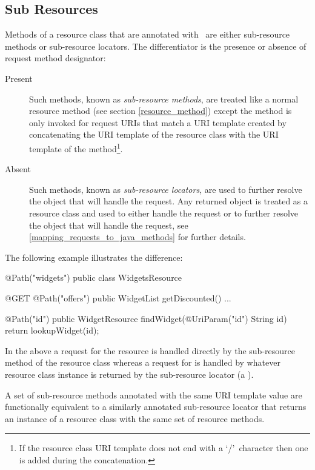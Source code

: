 \subsection{Sub Resources}
\label{sub_resources}

Methods of a resource class that are annotated with \Path\ are either sub-resource methods or sub-resource locators. The differentiator is the presence or absence of request method designator:

\begin{description}
\item[Present] Such methods, known as {\em sub-resource methods}, are treated like a normal resource method (see section \ref{resource_method}) except the method is only invoked for request URIs that match a URI template created by concatenating the URI template of the resource class with the URI template of the method\footnote{If the resource class URI template does not end with a \lq/\rq\ character then one is added during the concatenation.}.
\item[Absent] Such methods, known as {\em sub-resource locators}, are used to further resolve the object that will handle the request. Any returned object is treated as a resource class and used to either handle the request or to further resolve the object that will handle the request, see \ref{mapping_requests_to_java_methods} for further details.
\end{description}

The following example illustrates the difference:

\begin{listing}{1}
@Path("widgets")
public class WidgetsResource {
  @GET
  @Path("offers")
  public WidgetList getDiscounted() {...}
  
  @Path("{id}")
  public WidgetResource findWidget(@UriParam("id") String id) {
    return lookupWidget(id);
  }
}\end{listing}

In the above a  request for the  resource is handled directly by the  sub-resource method of the resource class  whereas a  request for  is handled by whatever resource class instance is returned by the  sub-resource locator (a ).

\begin{nnnote}A set of sub-resource methods annotated with the same URI template value are functionally equivalent to a similarly annotated sub-resource locator that returns an instance of a resource class with the same set of resource methods.\end{nnnote}

